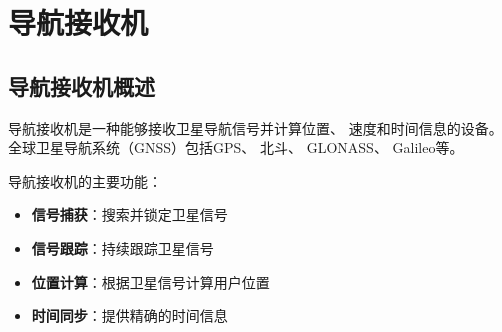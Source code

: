 
\chapter{导航接收机}
\label{chap:navigation_receiver}

\section{导航接收机概述}
\label{sec:nav_receiver_intro}

导航接收机是一种能够接收卫星导航信号并计算位置、
速度和时间信息的设备。
全球卫星导航系统（GNSS）包括GPS、
北斗、
GLONASS、
Galileo等。

导航接收机的主要功能：
\begin{itemize}
    \item \textbf{信号捕获}：搜索并锁定卫星信号
    \item \textbf{信号跟踪}：持续跟踪卫星信号
    \item \textbf{位置计算}：根据卫星信号计算用户位置
    \item \textbf{时间同步}：提供精确的时间信息
\end{itemize}

